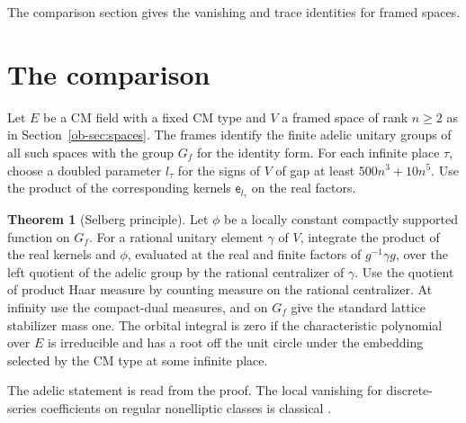 \documentclass[reqno]{amsart}
\theoremstyle{definition}
\newtheorem{theorem}{Theorem}
\newcommand{\ee}{\mathsf e}
\begin{document}
The comparison section gives the vanishing and trace identities for framed spaces.

\section{The comparison}\label{sec:comparison}

Let \(E\) be a CM field with a fixed CM type and \(V\) a framed space of rank \(n\ge2\) as in Section~\ref{ob-sec:spaces}. The frames identify the finite adelic unitary groups of all such spaces with the group \(G_f\) for the identity form. For each infinite place \(\tau\), choose a doubled parameter \(l_\tau\) for the signs of \(V\) of gap at least \(500n^3+10n^5\). Use the product of the corresponding kernels \(\ee_{l_\tau}\) on the real factors.

\begin{theorem}[Selberg principle]\label{thm:selberg}
Let \(\phi\) be a locally constant compactly supported function on \(G_f\). For a rational unitary element \(\gamma\) of \(V\), integrate the product of the real kernels and \(\phi\), evaluated at the real and finite factors of \(g^{-1}\gamma g\), over the left quotient of the adelic group by the rational centralizer of \(\gamma\). Use the quotient of product Haar measure by counting measure on the rational centralizer. At infinity use the compact-dual measures, and on \(G_f\) give the standard lattice stabilizer mass one. The orbital integral is zero if the characteristic polynomial over \(E\) is irreducible and has a root off the unit circle under the embedding selected by the CM type at some infinite place.
\end{theorem}

\noindent The adelic statement is read from the proof. The local vanishing for discrete-series coefficients on regular nonelliptic classes is classical \cite[formula~(1)]{Art}.
\end{document}
